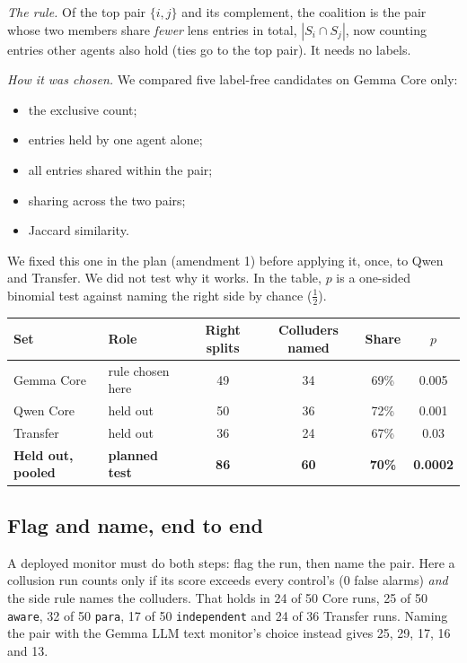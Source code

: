 \documentclass[11pt]{article}
\begin{document}
\emph{The rule.} Of the top pair $\{i,j\}$ and its complement, the coalition is the pair whose two members share \emph{fewer} lens entries in total, $|S_i \cap S_j|$, now counting entries other agents also hold (ties go to the top pair). It needs no labels.

\emph{How it was chosen.} We compared five label-free candidates on Gemma Core only:
\begin{itemize}
\item the exclusive count;
\item entries held by one agent alone;
\item all entries shared within the pair;
\item sharing across the two pairs;
\item Jaccard similarity.
\end{itemize}
We fixed this one in the plan (amendment 1) before applying it, once, to Qwen and Transfer. We did not test why it works. In the table, $p$ is a one-sided binomial test against naming the right side by chance ($\tfrac12$).

\begin{center}\small
\begin{tabular}{llcccc}
\toprule
Set & Role & Right splits & Colluders named & Share & $p$\\
\midrule
Gemma Core & rule chosen here & 49 & 34 & 69\% & 0.005\\
Qwen Core & held out & 50 & 36 & 72\% & 0.001\\
Transfer & held out & 36 & 24 & 67\% & 0.03\\
\textbf{Held out, pooled} & \textbf{planned test} & \textbf{86} & \textbf{60} & \textbf{70\%} & \textbf{0.0002}\\
\bottomrule
\end{tabular}
\end{center}

\subsection{Flag and name, end to end}
A deployed monitor must do both steps: flag the run, then name the pair. Here a collusion run counts only if its score exceeds every control's (0 false alarms) \emph{and} the side rule names the colluders. That holds in 24 of 50 Core runs, 25 of 50 \texttt{aware}, 32 of 50 \texttt{para}, 17 of 50 \texttt{independent} and 24 of 36 Transfer runs. Naming the pair with the Gemma LLM text monitor's choice instead gives 25, 29, 17, 16 and 13.
\end{document}
